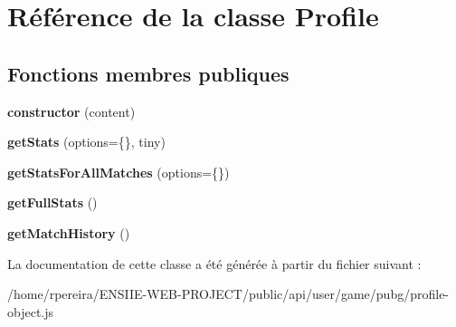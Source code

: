 \hypertarget{classProfile}{}\section{Référence de la classe Profile}
\label{classProfile}
\subsection*{Fonctions membres publiques}
\begin{DoxyCompactItemize}
\item 
{\bfseries constructor} (content)\hypertarget{classProfile_a90d58b1ae9def2418df099ba3fa9d6e1}{}\label{classProfile_a90d58b1ae9def2418df099ba3fa9d6e1}

\item 
{\bfseries get\+Stats} (options=\{\}, tiny)\hypertarget{classProfile_ab5a7fe733fbbf67d4e47f13730daf926}{}\label{classProfile_ab5a7fe733fbbf67d4e47f13730daf926}

\item 
{\bfseries get\+Stats\+For\+All\+Matches} (options=\{\})\hypertarget{classProfile_a36fcc8532d6a49defdcae214bd0d1feb}{}\label{classProfile_a36fcc8532d6a49defdcae214bd0d1feb}

\item 
{\bfseries get\+Full\+Stats} ()\hypertarget{classProfile_ae2d84252456c86eec4e9364f3c447308}{}\label{classProfile_ae2d84252456c86eec4e9364f3c447308}

\item 
{\bfseries get\+Match\+History} ()\hypertarget{classProfile_af1372f9176272f74646c50adfad8aac9}{}\label{classProfile_af1372f9176272f74646c50adfad8aac9}

\end{DoxyCompactItemize}


La documentation de cette classe a été générée à partir du fichier suivant \+:\begin{DoxyCompactItemize}
\item 
/home/rpereira/\+E\+N\+S\+I\+I\+E-\/\+W\+E\+B-\/\+P\+R\+O\+J\+E\+C\+T/public/api/user/game/pubg/profile-\/object.\+js\end{DoxyCompactItemize}
